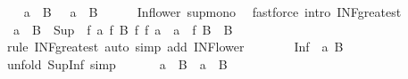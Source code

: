 \begin{isabellebody}
\ \ \isamarkupfalse%
\ {\isachardoublequoteopen}a\ {\isasymsqunion}\ {\isasymSqinter}B\ {\isasymle}\ {\isasymSqinter}{\isacharparenleft}{\kern0pt}{\isacharparenleft}{\kern0pt}{\isasymsqunion}{\isacharparenright}{\kern0pt}\ a\ {\isacharbackquote}{\kern0pt}\ B{\isacharparenright}{\kern0pt}{\isachardoublequoteclose}\isanewline
\ \ \ \ \isamarkupfalse%
\ Inf{\isacharunderscore}{\kern0pt}lower\ sup{\isachardot}{\kern0pt}mono\ \isamarkupfalse%
\ {\isacharparenleft}{\kern0pt}fastforce\ intro{\isacharcolon}{\kern0pt}\ INF{\isacharunderscore}{\kern0pt}greatest{\isacharparenright}{\kern0pt}\isanewline
{}\isamarkupfalse%
\isanewline
\ \ \isamarkupfalse%
\ {\isachardoublequoteopen}{\isasymSqinter}{\isacharparenleft}{\kern0pt}{\isacharparenleft}{\kern0pt}{\isasymsqunion}{\isacharparenright}{\kern0pt}\ a\ {\isacharbackquote}{\kern0pt}\ B{\isacharparenright}{\kern0pt}\ {\isasymle}\ {\isasymSqinter}{\isacharparenleft}{\kern0pt}Sup\ {\isacharbackquote}{\kern0pt}\ {\isacharbraceleft}{\kern0pt}{\isacharbraceleft}{\kern0pt}f\ {\isacharbraceleft}{\kern0pt}a{\isacharbraceright}{\kern0pt}{\isacharcomma}{\kern0pt}\ f\ B{\isacharbraceright}{\kern0pt}\ {\isacharbar}{\kern0pt}f{\isachardot}{\kern0pt}\ f\ {\isacharbraceleft}{\kern0pt}a{\isacharbraceright}{\kern0pt}\ {\isacharequal}{\kern0pt}\ a\ {\isasymand}\ f\ B\ {\isasymin}\ B{\isacharbraceright}{\kern0pt}{\isacharparenright}{\kern0pt}{\isachardoublequoteclose}\isanewline
\ \ \ \ \isamarkupfalse%
\ {\isacharparenleft}{\kern0pt}rule\ INF{\isacharunderscore}{\kern0pt}greatest{\isacharcomma}{\kern0pt}\ auto\ simp\ add{\isacharcolon}{\kern0pt}\ INF{\isacharunderscore}{\kern0pt}lower{\isacharparenright}{\kern0pt}\isanewline
\ \ \isamarkupfalse%
\ \isamarkupfalse%
\ {\isachardoublequoteopen}{\isachardot}{\kern0pt}{\isachardot}{\kern0pt}{\isachardot}{\kern0pt}\ {\isacharequal}{\kern0pt}\ {\isasymSqunion}{\isacharparenleft}{\kern0pt}Inf\ {\isacharbackquote}{\kern0pt}\ {\isacharbraceleft}{\kern0pt}{\isacharbraceleft}{\kern0pt}a{\isacharbraceright}{\kern0pt}{\isacharcomma}{\kern0pt}\ B{\isacharbraceright}{\kern0pt}{\isacharparenright}{\kern0pt}{\isachardoublequoteclose}\isanewline
\ \ \ \ \isamarkupfalse%
\ {\isacharparenleft}{\kern0pt}unfold\ Sup{\isacharunderscore}{\kern0pt}Inf{\isacharcomma}{\kern0pt}\ simp{\isacharparenright}{\kern0pt}\isanewline
\ \ \isamarkupfalse%
\ \isamarkupfalse%
\ {\isachardoublequoteopen}{\isasymSqinter}{\isacharparenleft}{\kern0pt}{\isacharparenleft}{\kern0pt}{\isasymsqunion}{\isacharparenright}{\kern0pt}\ a\ {\isacharbackquote}{\kern0pt}\ B{\isacharparenright}{\kern0pt}\ {\isasymle}\ a\ {\isasymsqunion}\ {\isasymSqinter}B{\isachardoublequoteclose}\isanewline

\end{isabellebody}
